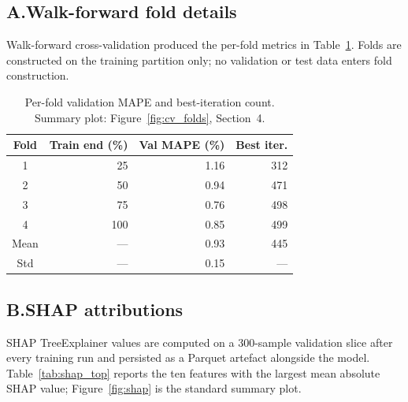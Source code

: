 \documentclass[11pt,a4paper]{article}
\begin{document}
\subsection*{A.\quad Walk-forward fold details}
\label{app:cv}

Walk-forward cross-validation produced the per-fold metrics in Table~\ref{tab:cv_folds}. Folds are constructed on the training partition only; no validation or test data enters fold construction.

\begin{table}[H]
\centering
\small
\begin{tabularx}{0.7\linewidth}{@{}c r r r@{}}
\toprule
\textbf{Fold} & \textbf{Train end (\%)} & \textbf{Val MAPE (\%)} & \textbf{Best iter.}\\
\midrule
1 & 25 & 1.16 & 312 \\
2 & 50 & 0.94 & 471 \\
3 & 75 & 0.76 & 498 \\
4 & 100 & 0.85 & 499 \\
\midrule
Mean & --- & 0.93 & 445 \\
Std  & --- & 0.15 & --- \\
\bottomrule
\end{tabularx}
\caption{Per-fold validation MAPE and best-iteration count. Summary plot: Figure~\ref{fig:cv_folds}, Section~4.}
\label{tab:cv_folds}
\end{table}

\subsection*{B.\quad SHAP attributions}
\label{app:shap}

SHAP TreeExplainer values are computed on a 300-sample validation slice after every training run and persisted as a Parquet artefact alongside the model. Table~\ref{tab:shap_top} reports the ten features with the largest mean absolute SHAP value; Figure~\ref{fig:shap} is the standard summary plot.
\end{document}
